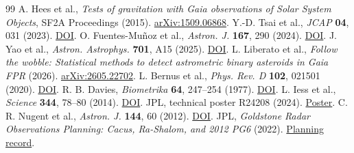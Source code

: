 \documentclass[11pt,a4paper]{article}
\begin{document}
\begin{thebibliography}{99}
 A. Hees et al., \emph{Tests of gravitation with Gaia observations of Solar System Objects}, SF2A Proceedings (2015). \href{https://arxiv.org/abs/1509.06868}{arXiv:1509.06868}.
 Y.-D. Tsai et al., \emph{JCAP} \textbf{04}, 031 (2023). \href{https://doi.org/10.1088/1475-7516/2023/04/031}{DOI}.
 O. Fuentes-Muñoz et al., \emph{Astron. J.} \textbf{167}, 290 (2024). \href{https://doi.org/10.3847/1538-3881/ad4291}{DOI}.
 J. Yao et al., \emph{Astron. Astrophys.} \textbf{701}, A15 (2025). \href{https://doi.org/10.1051/0004-6361/202452534}{DOI}.
 L. Liberato et al., \emph{Follow the wobble: Statistical methods to detect astrometric binary asteroids in Gaia FPR} (2026). \href{https://arxiv.org/abs/2605.22702}{arXiv:2605.22702}.
 L. Bernus et al., \emph{Phys. Rev. D} \textbf{102}, 021501 (2020). \href{https://doi.org/10.1103/PhysRevD.102.021501}{DOI}.
 R. B. Davies, \emph{Biometrika} \textbf{64}, 247--254 (1977). \href{https://doi.org/10.1093/biomet/64.2.247}{DOI}.
 L. Iess et al., \emph{Science} \textbf{344}, 78--80 (2014). \href{https://doi.org/10.1126/science.1250551}{DOI}.
 JPL, technical poster R24208 (2024). \href{https://www.jpl.nasa.gov/site/research/media/posters/2024/R24208p.pdf}{Poster}.
 C. R. Nugent et al., \emph{Astron. J.} \textbf{144}, 60 (2012). \href{https://doi.org/10.1088/0004-6256/144/2/60}{DOI}.
 JPL, \emph{Goldstone Radar Observations Planning: Cacus, Ra-Shalom, and 2012 PG6} (2022). \href{https://echo.jpl.nasa.gov/asteroids/Cacus/Cacus.2022.goldstone.planning.html}{Planning record}.
\end{thebibliography}
\end{document}
